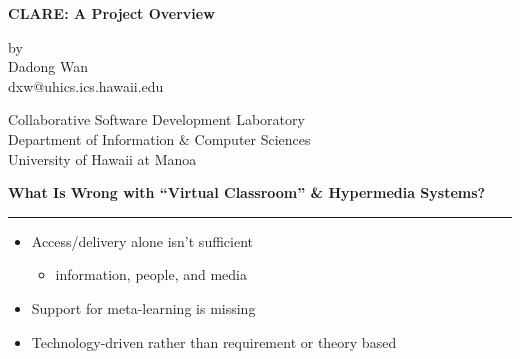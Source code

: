 %
\newcommand{\horizontalline} {\rule{\textwidth}{.02in}} 
\pagestyle{empty}
      



\begin{slide}  \Huge
  \begin{center}
    {\bf CLARE: A Project Overview}
    
    \vspace{0.5in}
    
    by\\
    Dadong Wan\\
    {\sf dxw@uhics.ics.hawaii.edu}
    
    \vspace{0.5in}
    
    Collaborative Software Development Laboratory \\
    Department of Information \& Computer Sciences\\
    University of Hawaii at Manoa
  \end{center}
\end{slide}  


\begin{slide}   \Huge
  {\bf What Is Wrong with ``Virtual Classroom'' \& Hypermedia Systems?}
  \horizontalline
  
  \begin{itemize}
  \item Access/delivery alone isn't sufficient
    \begin{itemize}
    \item information, people, and media
    \end{itemize}
    
  \item Support for meta-learning is missing
    
  \item Technology-driven rather than requirement or theory based
  \end{itemize}
\end{slide}


